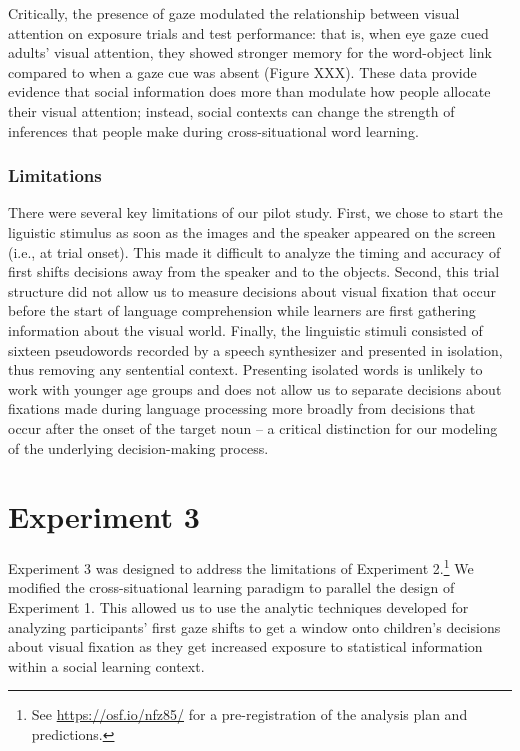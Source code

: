 \documentclass[man,floatsintext]{apa6}
\let\rmarkdownfootnote\footnote%
\def\footnote{\protect\rmarkdownfootnote}
\begin{document}
Critically, the presence of gaze modulated the relationship between
visual attention on exposure trials and test performance: that is, when
eye gaze cued adults' visual attention, they showed stronger memory for
the word-object link compared to when a gaze cue was absent (Figure
XXX). These data provide evidence that social information does more than
modulate how people allocate their visual attention; instead, social
contexts can change the strength of inferences that people make during
cross-situational word learning.

\hypertarget{limitations}{%
\subsubsection{Limitations}\label{limitations}}

There were several key limitations of our pilot study. First, we chose
to start the liguistic stimulus as soon as the images and the speaker
appeared on the screen (i.e., at trial onset). This made it difficult to
analyze the timing and accuracy of first shifts decisions away from the
speaker and to the objects. Second, this trial structure did not allow
us to measure decisions about visual fixation that occur before the
start of language comprehension while learners are first gathering
information about the visual world. Finally, the linguistic stimuli
consisted of sixteen pseudowords recorded by a speech synthesizer and
presented in isolation, thus removing any sentential context. Presenting
isolated words is unlikely to work with younger age groups and does not
allow us to separate decisions about fixations made during language
processing more broadly from decisions that occur after the onset of the
target noun -- a critical distinction for our modeling of the underlying
decision-making process.

\hypertarget{experiment-3}{%
\section{Experiment 3}\label{experiment-3}}

Experiment 3 was designed to address the limitations of Experiment
2.\footnote{See \url{https://osf.io/nfz85/} for a pre-registration of
  the analysis plan and predictions.} We modified the cross-situational
learning paradigm to parallel the design of Experiment 1. This allowed
us to use the analytic techniques developed for analyzing participants'
first gaze shifts to get a window onto children's decisions about visual
fixation as they get increased exposure to statistical information
within a social learning context.
\end{document}
